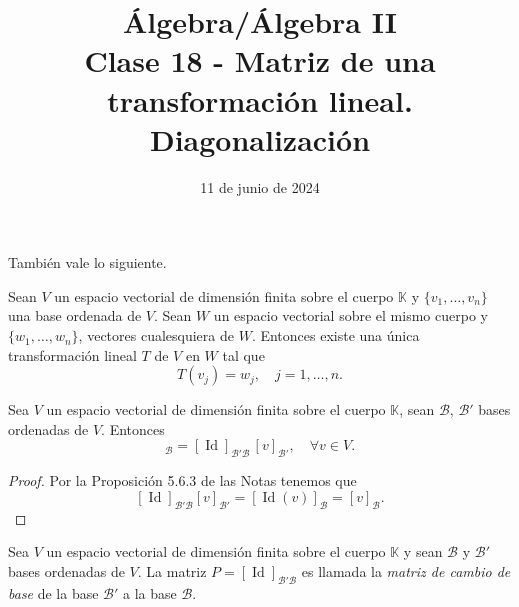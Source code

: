 \documentclass[handout]{beamer} %
\title[Clase 18 -  Matriz de una transformación lineal. Diagonalización]{Álgebra/Álgebra II \\Clase 18 -  Matriz de una transformación lineal. Diagonalización}
\author[]{}
\institute[]{\normalsize FAMAF / UNC
    \\[\baselineskip] ${}^{}$
    \\[\baselineskip]
}
\date[11/06/2024]{11 de junio de 2024}
\newcommand{\Id}{\operatorname{Id}}
\newcommand{\K}{\mathbb K}
\begin{document}
\begin{frame}
\maketitle
\end{frame}



\begin{frame}
    \pause
También vale  lo siguiente.
\pause
\begin{teorema}\label{th-tl-definida-en-base}
    Sean $V$ un espacio vectorial de dimensión finita sobre el cuerpo $\K$ y $\{v_1,\ldots,v_n\}$  una base ordenada de $V$. Sean $W$ un espacio vectorial sobre el mismo cuerpo y $\{w_1,\ldots,w_n\}$, vectores cualesquiera de $W$. Entonces existe una única transformación  lineal $T$ de $V$ en $W$ tal que
    \begin{equation*}
    T(v_j) = w_j, \quad j=1,\ldots,n.
    \end{equation*}
\end{teorema}

\end{frame}

\begin{frame}
    \begin{corolario}\label{cor-cambio-de-base}
        Sea $V$ un espacio vectorial de dimensión finita sobre el cuerpo $\K$, sean $\mathcal B$, $\mathcal B'$  bases ordenadas de $V$. Entonces 
        \begin{equation*}
            [v]_{\mathcal B} = [\Id]_{\mathcal B' \mathcal B}\, [v]_{\mathcal B'}, \quad \forall v \in V.
        \end{equation*}
    \end{corolario}\pause
    \begin{proof}\pause
        Por la Proposición 5.6.3 de las Notas tenemos que 
        $$
        [\Id]_{\mathcal B' \mathcal B}  [v]_{\mathcal B'} = [\Id (v)]_{\mathcal B} = [v]_{\mathcal B}.
        $$
    \end{proof}
    \pause
    \begin{definicion}
        Sea $V$ un espacio vectorial de dimensión finita sobre el cuerpo $\K$ y sean $\mathcal B$ y $\mathcal B'$ bases ordenadas de $V$. La matriz $P =[\Id]_{\mathcal B' \mathcal B}$  es llamada la \textit{matriz de cambio de base}  de la base $\mathcal B'$  a la base $\mathcal B$. 
    \end{definicion}

    

\end{frame}
\end{document}
